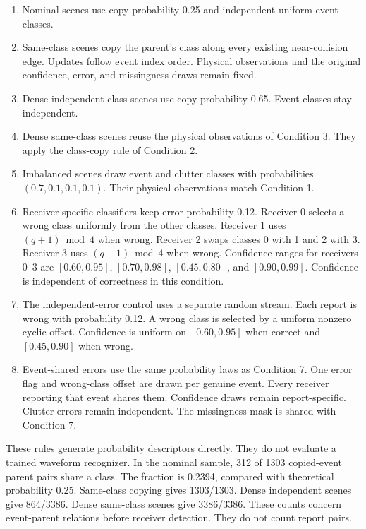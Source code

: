 \begin{enumerate}[leftmargin=1.5em,itemsep=3pt]
\item Nominal scenes use copy probability 0.25 and independent uniform event classes.
\item Same-class scenes copy the parent's class along every existing near-collision edge. Updates follow event index order. Physical observations and the original confidence, error, and missingness draws remain fixed.
\item Dense independent-class scenes use copy probability 0.65. Event classes stay independent.
\item Dense same-class scenes reuse the physical observations of Condition 3. They apply the class-copy rule of Condition 2.
\item Imbalanced scenes draw event and clutter classes with probabilities $(0.7,0.1,0.1,0.1)$. Their physical observations match Condition 1.
\item Receiver-specific classifiers keep error probability 0.12. Receiver 0 selects a wrong class uniformly from the other classes. Receiver 1 uses $(q+1)\bmod4$ when wrong. Receiver 2 swaps classes 0 with 1 and 2 with 3. Receiver 3 uses $(q-1)\bmod4$ when wrong. Confidence ranges for receivers 0--3 are $[0.60,0.95]$, $[0.70,0.98]$, $[0.45,0.80]$, and $[0.90,0.99]$. Confidence is independent of correctness in this condition.
\item The independent-error control uses a separate random stream. Each report is wrong with probability 0.12. A wrong class is selected by a uniform nonzero cyclic offset. Confidence is uniform on $[0.60,0.95]$ when correct and $[0.45,0.90]$ when wrong.
\item Event-shared errors use the same probability laws as Condition 7. One error flag and wrong-class offset are drawn per genuine event. Every receiver reporting that event shares them. Confidence draws remain report-specific. Clutter errors remain independent. The missingness mask is shared with Condition 7.
\end{enumerate}

These rules generate probability descriptors directly. They do not evaluate a trained waveform recognizer. In the nominal sample, 312 of 1303 copied-event parent pairs share a class. The fraction is 0.2394, compared with theoretical probability 0.25. Same-class copying gives 1303/1303. Dense independent scenes give 864/3386. Dense same-class scenes give 3386/3386. These counts concern event-parent relations before receiver detection. They do not count report pairs.

